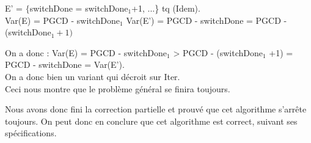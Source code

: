 E' = $\{$switchDone = switchDone$_{1}$+1, ...\} tq (Idem).\\

Var(E) = PGCD - switchDone$_{1}$
Var(E') = PGCD - switchDone = PGCD - (switchDone$_{1}+1)$

On a donc : Var(E) = PGCD - switchDone$_{1}$ > PGCD - (switchDone$_1$ +1) = PGCD - switchDone = Var(E').\\

On a donc bien un variant qui décroit sur Iter.\\

Ceci nous montre que le problème général se finira toujours. 

Nous avons donc fini la correction partielle et prouvé que cet algorithme s'arrête toujours. On peut donc en conclure que cet algorithme est correct, suivant ses spécifications. 
